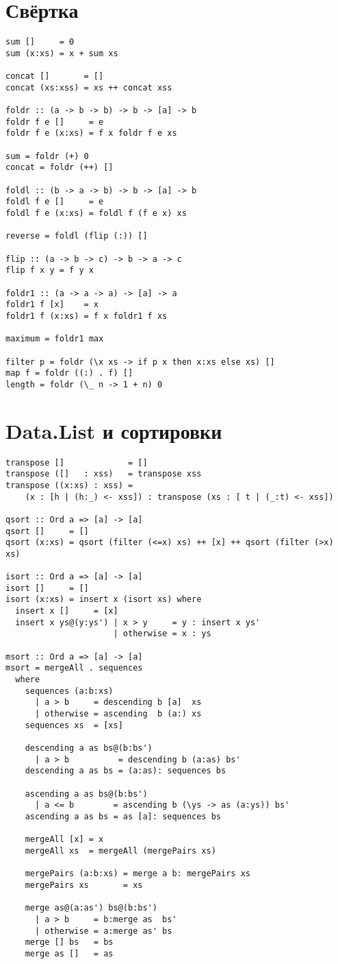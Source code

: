 \documentclass[a4paper,10pt]{article}
\begin{document}
\section{Свёртка}

\begin{lstlisting}
sum []     = 0
sum (x:xs) = x + sum xs

concat []       = []
concat (xs:xss) = xs ++ concat xss

foldr :: (a -> b -> b) -> b -> [a] -> b
foldr f e []     = e
foldr f e (x:xs) = f x foldr f e xs

sum = foldr (+) 0
concat = foldr (++) []

foldl :: (b -> a -> b) -> b -> [a] -> b
foldl f e []     = e
foldl f e (x:xs) = foldl f (f e x) xs

reverse = foldl (flip (:)) []

flip :: (a -> b -> c) -> b -> a -> c
flip f x y = f y x

foldr1 :: (a -> a -> a) -> [a] -> a
foldr1 f [x]    = x
foldr1 f (x:xs) = f x foldr1 f xs

maximum = foldr1 max

filter p = foldr (\x xs -> if p x then x:xs else xs) []
map f = foldr ((:) . f) []
length = foldr (\_ n -> 1 + n) 0

\end{lstlisting}

\section{Data.List и сортировки}
\begin{lstlisting}
transpose []             = []
transpose ([]   : xss)   = transpose xss
transpose ((x:xs) : xss) =
    (x : [h | (h:_) <- xss]) : transpose (xs : [ t | (_:t) <- xss])

qsort :: Ord a => [a] -> [a]
qsort []     = []
qsort (x:xs) = qsort (filter (<=x) xs) ++ [x] ++ qsort (filter (>x) xs)

isort :: Ord a => [a] -> [a]
isort []     = []
isort (x:xs) = insert x (isort xs) where
  insert x []     = [x]
  insert x ys@(y:ys') | x > y     = y : insert x ys'
                      | otherwise = x : ys

msort :: Ord a => [a] -> [a]
msort = mergeAll . sequences
  where
    sequences (a:b:xs)
      | a > b     = descending b [a]  xs
      | otherwise = ascending  b (a:) xs
    sequences xs  = [xs]

    descending a as bs@(b:bs')
      | a > b          = descending b (a:as) bs'
    descending a as bs = (a:as): sequences bs

    ascending a as bs@(b:bs')
      | a <= b        = ascending b (\ys -> as (a:ys)) bs'
    ascending a as bs = as [a]: sequences bs

    mergeAll [x] = x
    mergeAll xs  = mergeAll (mergePairs xs)

    mergePairs (a:b:xs) = merge a b: mergePairs xs
    mergePairs xs       = xs

    merge as@(a:as') bs@(b:bs')
      | a > b     = b:merge as  bs'
      | otherwise = a:merge as' bs
    merge [] bs   = bs
    merge as []   = as
\end{lstlisting}
\end{document}

